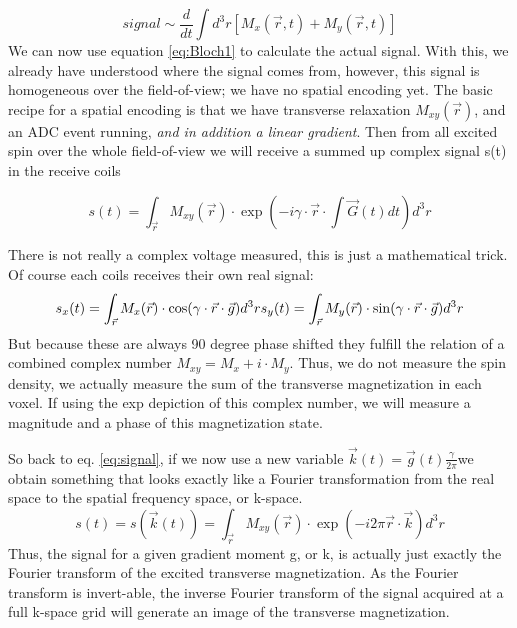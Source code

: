 \documentclass[a4paper,12pt]{extarticle}
\begin{document}
\begin{equation}
signal\sim\frac{d}{dt}\int d^{3}r[M_{x}(\vec{r},t)+M_{y}(\vec{r},t)]
\end{equation}
We can now use equation \eqref{eq:Bloch1} to calculate the actual signal. With this, we already have understood where the signal comes from, however, this signal is homogeneous over the field-of-view; we have no spatial encoding yet. 
 The basic recipe for a spatial encoding is that we have transverse relaxation $M_{xy}(\vec{r})$,  and an ADC event running, \emph{and in addition a linear gradient}. Then from all excited spin over the whole field-of-view we will receive a summed up complex signal s(t) in the receive coils  
 
 \begin{equation} \label{eq:signal}
     s(t) = \int_{\vec{r}}M_{xy}(\vec{r})\cdot \exp\left(-i\gamma\cdot \vec{r}\cdot \int \vec{G}(t)dt\right) d^3r
 \end{equation}
 
There is not really a complex voltage measured, this is just a mathematical trick. Of course each coils receives their own real signal:   
\begin{equation}
 s_x(t) = \int_{\vec{r}} M_{x}(\vec{r})\cdot \cos(\gamma\cdot\vec{r}\cdot \vec{g}) d^3r \\
 s_y(t) = \int_{\vec{r}} M_{y}(\vec{r})\cdot \sin(\gamma\cdot \vec{r}\cdot \vec{g}) d^3r \\
 \end{equation}
 But because these are always 90 degree phase shifted they fulfill the relation of a combined complex number $M_{xy}=M_x+i\cdot M_y$. Thus, we do not measure the spin density, we actually measure the sum of the transverse magnetization in each voxel. If using the exp depiction of this complex number, we will measure a magnitude and a phase of this magnetization state.
 
So back to eq. \eqref{eq:signal}, if we now use a new variable $\vec{k}(t)=\vec{g}(t)\frac{\gamma}{2\pi}$we obtain something that looks exactly like a Fourier transformation from the real space to the spatial frequency space, or k-space.
 \begin{equation} \label{eq:signal_kspace}
    s(t)=  s(\vec{k}(t)) = \int_{\vec{r}} M_{xy}(\vec{r})\cdot\exp(-i2\pi\vec{r}\cdot \vec{k}) d^3r
 \end{equation}Thus, the signal for a given gradient moment g, or k, is  actually just exactly the Fourier transform of the  excited transverse magnetization. 
 As the Fourier transform is invert-able, the inverse Fourier transform of the signal acquired at a full k-space grid will generate an image of the transverse magnetization.
 
\end{document}
